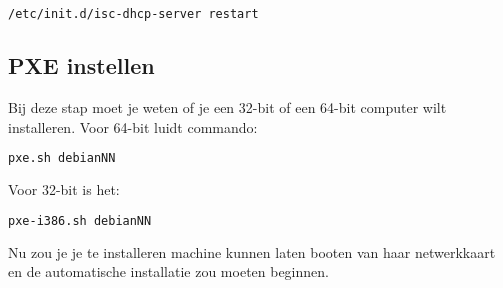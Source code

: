 \begin{lstlisting}[language=bash]
/etc/init.d/isc-dhcp-server restart
\end{lstlisting}


\subsection{PXE instellen}
Bij deze stap moet je weten of je een 32-bit of een 64-bit computer wilt installeren.
Voor 64-bit luidt commando:
\begin{lstlisting}[language=bash]
pxe.sh debianNN
\end{lstlisting}
Voor 32-bit is het:
\begin{lstlisting}[language=bash]
pxe-i386.sh debianNN
\end{lstlisting}

Nu zou je je te installeren machine kunnen laten booten van haar netwerkkaart en de automatische installatie zou moeten beginnen.

